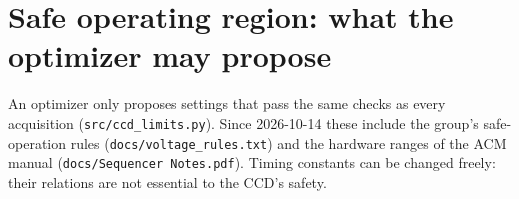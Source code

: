 \documentclass[10pt]{article}
\newcommand{\code}[1]{\texttt{#1}}
\begin{document}
\section{Safe operating region: what the optimizer may propose}
\label{sec:safety}

\begin{basic}
An optimizer only proposes settings that pass the same checks as every acquisition (\code{src/ccd\_limits.py}). Since 2026-10-14 these
include the group's safe-operation rules (\code{docs/voltage\_rules.txt}) and the hardware ranges of the ACM manual
(\code{docs/Sequencer Notes.pdf}). Timing constants can be changed freely: their relations are not essential to the CCD's safety.
\end{basic}
\end{document}
